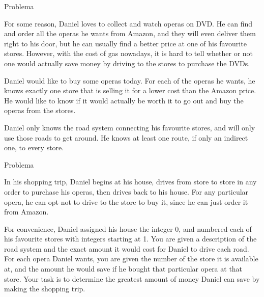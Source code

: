 
\begin{frame}[fragile]{Problema}

For some reason, Daniel loves to collect and watch operas on DVD. He can find and order all the 
operas he wants from Amazon, and they will even deliver them right to his door, but he can usually 
find a better price at one of his favourite stores. However, with the cost of gas nowadays, it is 
hard to tell whether or not one would actually save money by driving to the stores to purchase the 
DVDs.

Daniel would like to buy some operas today. For each of the operas he wants, he knows exactly
one store that is selling it for a lower cost than the Amazon price. He would like to know if it 
would actually be worth it to go out and buy the operas from the stores.

Daniel only knows the road system connecting his favourite stores, and will only use those roads to
get around. He knows at least one route, if only an indirect one, to every store.

\end{frame}

\begin{frame}[fragile]{Problema}

In his shopping trip, Daniel begins at his house, drives from store to store in any order to 
purchase his operas, then drives back to his house. For any particular opera, he can opt not to 
drive to the store to buy it, since he can just order it from Amazon.

For convenience, Daniel assigned his house the integer 0, and numbered each of his favourite stores
with integers starting at 1. You are given a description of the road system and the exact amount it
would cost for Daniel to drive each road. For each opera Daniel wants, you are given the number of 
the store it is available at, and the amount he would save if he bought that particular opera at 
that store.  Your task is to determine the greatest amount of money Daniel can save by making the 
shopping trip.

\end{frame}


